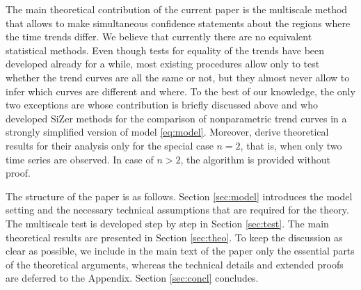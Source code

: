 \documentclass[a4paper,12pt]{article}
\begin{document}


The main theoretical contribution of the current paper is the multiscale method that allows to make simultaneous confidence statements about the regions where the time trends differ. We believe that currently there are no equivalent statistical methods. Even though tests for equality of the trends have been developed already for a while, most existing procedures allow only to test whether the trend curves are all the same or not, but they almost never allow to infer which curves are different and where. To the best of our knowledge, the only two exceptions are \cite{KhismatullinaVogt2021} whose contribution is briefly discussed above and \cite{Park2009} who developed SiZer methods for the comparison of nonparametric trend curves in a strongly simplified version of \linebreak model \eqref{eq:model}. Moreover, \cite{Park2009} derive theoretical results for their analysis only for the special case $n=2$, that is, when only two time series are observed. In case of $n>2$, the algorithm is provided without proof.

The structure of the paper is as follows. Section \ref{sec:model} introduces the model setting and the necessary technical assumptions that are required for the theory. The multiscale test is developed step by step in Section \ref{sec:test}. The main theoretical results are presented in Section \ref{sec:theo}. To keep the discussion as clear as possible, we include in the main text of the paper only the essential parts of the theoretical arguments, whereas the technical details and extended proofs are deferred to the Appendix. Section \ref{sec:concl} concludes.
\end{document}
